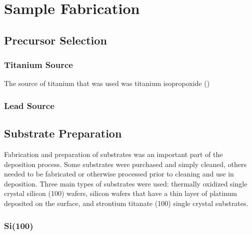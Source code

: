 \chapter{Sample Fabrication}
\label{ch:Fabrication}
\thispagestyle{empty}



\section{Precursor Selection}

\lipsum

\subsection{Titanium Source}

The source of titanium that was used was titanium isopropoxide (\TiOiPr{})

\subsection{Lead Source}

\lipsum


\section{Substrate Preparation}

Fabrication and preparation of substrates was an important part of the deposition process. Some substrates were purchased and simply cleaned, others needed to be fabricated or otherwise processed prior to cleaning and use in deposition. Three main types of substrates were used: thermally oxidized single crystal silicon (100) wafers, silicon wafers that have a thin layer of platinum deposited on the surface, and strontium titanate (100) single crystal substrates. 

\subsection{Si(100)} \label{sect:Si}

